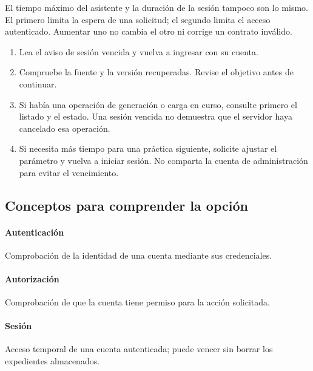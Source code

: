 El tiempo máximo del asistente y la duración de la sesión tampoco son lo mismo. El primero limita la espera de una solicitud; el segundo limita el acceso autenticado. Aumentar uno no cambia el otro ni corrige un contrato inválido.

\begin{enumerate}
\item Lea el aviso de sesión vencida y vuelva a ingresar con su cuenta.
\item Compruebe la fuente y la versión recuperadas. Revise el objetivo antes de continuar.
\item Si había una operación de generación o carga en curso, consulte primero el listado y el estado. Una sesión vencida no demuestra que el servidor haya cancelado esa operación.
\item Si necesita más tiempo para una práctica siguiente, solicite ajustar el parámetro y vuelva a iniciar sesión. No comparta la cuenta de administración para evitar el vencimiento.
\end{enumerate}

\subsection{Conceptos para comprender la opción}
\paragraph{Autenticación} Comprobación de la identidad de una cuenta mediante sus credenciales.

\paragraph{Autorización} Comprobación de que la cuenta tiene permiso para la acción solicitada.

\paragraph{Sesión} Acceso temporal de una cuenta autenticada; puede vencer sin borrar los expedientes almacenados.

